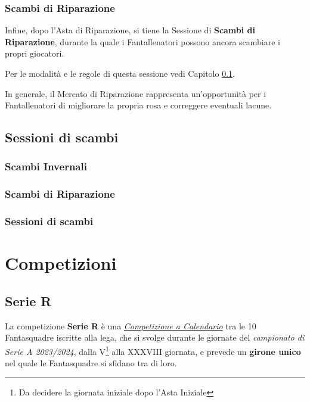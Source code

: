 \documentclass[12pt]{article}
\begin{document}
\subsubsection{Scambi di Riparazione}
Infine, dopo l'Asta di Riparazione, si tiene la Sessione di \textbf{Scambi di Riparazione}, durante la quale i Fantallenatori possono ancora scambiare i propri giocatori. \par Per le modalità e le regole di questa sessione vedi Capitolo \ref{subsec:sessioni-scambi}.

\vspace{10pt}

In generale, il Mercato di Riparazione rappresenta un'opportunità per i Fantallenatori di migliorare la propria rosa e correggere eventuali lacune.
\subsection{Sessioni di scambi}\label{subsec:sessioni-scambi}

\subsubsection{Scambi Invernali}

\subsubsection{Scambi di Riparazione}

\subsubsection{Sessioni di scambi}
\newpage
\section{Competizioni}\label{subsec:competizioni}

\subsection{Serie R}
La competizione \textbf{Serie R} è una \textit{\hyperref[competizione-a-calendario]{Competizione a Calendario}} tra le 10 Fantasquadre iscritte alla lega, che si svolge durante le giornate del \textit{campionato di Serie A 2023/2024}, dalla V\footnote{Da decidere la giornata iniziale dopo l'Asta Iniziale} alla XXXVIII giornata, e prevede un \textbf{girone unico} nel quale le Fantasquadre si sfidano tra di loro.
\end{document}
